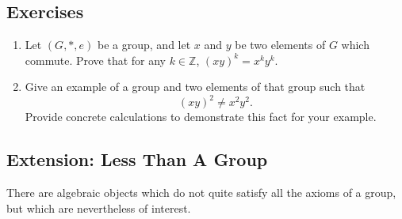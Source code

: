 \documentclass[10pt]{book}
\theoremstyle{break}
\newcounter{example}[section]
\newcommand{\integers}{\ensuremath{\mathbb{Z}}}
\begin{document}
\subsection*{Exercises}

\begin{enumerate}
  \item Let $(G, \ast, e)$ be a group, and let $x$ and $y$ be two elements
of $G$ which commute.  Prove that for any $k \in \integers$, $(xy)^{k} =
x^{k}y^{k}$.

  \item Give an example of a group and two elements of that group such that
  \[
    (xy)^{2} \ne x^{2}y^{2}.
  \]
  Provide concrete calculations to demonstrate this fact for your example.
\end{enumerate}

\subsection*{Extension: Less Than A Group}

There are algebraic objects which do not quite satisfy all the axioms of a
group, but which are nevertheless of interest.

\printindex
\end{document}
